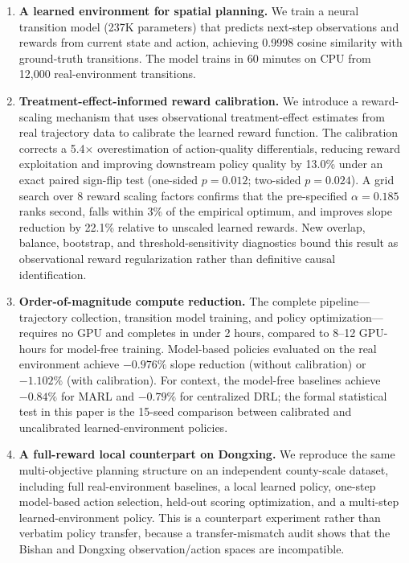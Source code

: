 \documentclass[11pt]{article}
\begin{document}
\begin{enumerate}
\item \textbf{A learned environment for spatial planning.} We train a neural transition model (237K parameters) that predicts next-step observations and rewards from current state and action, achieving 0.9998 cosine similarity with ground-truth transitions. The model trains in 60 minutes on CPU from 12{,}000 real-environment transitions.

\item \textbf{Treatment-effect-informed reward calibration.} We introduce a reward-scaling mechanism that uses observational treatment-effect estimates from real trajectory data to calibrate the learned reward function. The calibration corrects a 5.4$\times$ overestimation of action-quality differentials, reducing reward exploitation and improving downstream policy quality by 13.0\% under an exact paired sign-flip test (one-sided $p=0.012$; two-sided $p=0.024$). A grid search over 8 reward scaling factors confirms that the pre-specified $\alpha = 0.185$ ranks second, falls within 3\% of the empirical optimum, and improves slope reduction by 22.1\% relative to unscaled learned rewards. New overlap, balance, bootstrap, and threshold-sensitivity diagnostics bound this result as observational reward regularization rather than definitive causal identification.

\item \textbf{Order-of-magnitude compute reduction.} The complete pipeline---trajectory collection, transition model training, and policy optimization---requires no GPU and completes in under 2 hours, compared to 8--12 GPU-hours for model-free training. Model-based policies evaluated on the real environment achieve $-0.976\%$ slope reduction (without calibration) or $-1.102\%$ (with calibration). For context, the model-free baselines achieve $-0.84\%$ for MARL and $-0.79\%$ for centralized DRL; the formal statistical test in this paper is the 15-seed comparison between calibrated and uncalibrated learned-environment policies.

\item \textbf{A full-reward local counterpart on Dongxing.} We reproduce the same multi-objective planning structure on an independent county-scale dataset, including full real-environment baselines, a local learned policy, one-step model-based action selection, held-out scoring optimization, and a multi-step learned-environment policy. This is a counterpart experiment rather than verbatim policy transfer, because a transfer-mismatch audit shows that the Bishan and Dongxing observation/action spaces are incompatible.
\end{enumerate}
\end{document}
